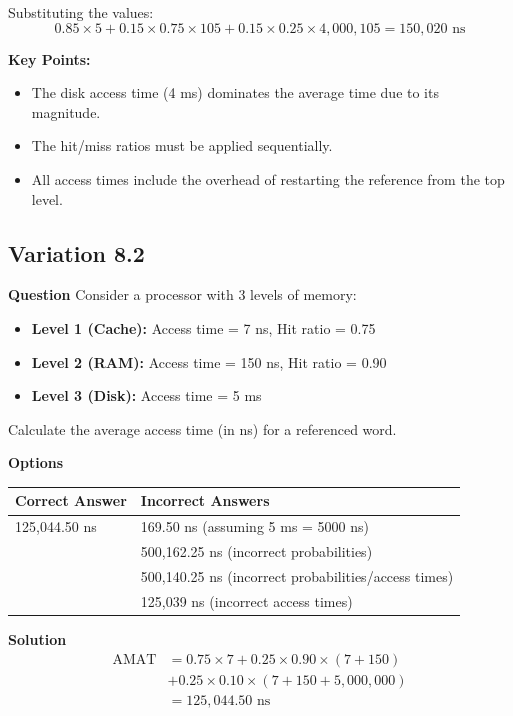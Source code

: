 \noindent Substituting the values:
\[
0.85 \times 5 + 0.15 \times 0.75 \times 105 + 0.15 \times 0.25 \times 4,000,105 = 150,020 \text{ ns}
\]

\noindent \textbf{Key Points:}
\begin{itemize}
    \item The disk access time (4 ms) dominates the average time due to its magnitude.
    \item The hit/miss ratios must be applied sequentially.
    \item All access times include the overhead of restarting the reference from the top level.
\end{itemize}



\subsection{Variation 8.2}
\textbf{Question}
Consider a processor with 3 levels of memory:
\begin{itemize}[leftmargin=*]
    \item \textbf{Level 1 (Cache):} Access time = 7 ns, Hit ratio = 0.75
    \item \textbf{Level 2 (RAM):} Access time = 150 ns, Hit ratio = 0.90
    \item \textbf{Level 3 (Disk):} Access time = 5 ms
\end{itemize}

\noindent Calculate the average access time (in ns) for a referenced word.

\textbf{Options}
\begin{tabular}{ll}
    \textbf{Correct Answer} & \textbf{Incorrect Answers} \\
    \hline
    125,044.50 ns & 169.50 ns (assuming 5 ms = 5000 ns) \\
    & 500,162.25 ns (incorrect probabilities) \\
    & 500,140.25 ns (incorrect probabilities/access times) \\
    & 125,039 ns (incorrect access times) \\
\end{tabular}

\textbf{Solution}
\[
\begin{aligned}
\text{AMAT} &= 0.75 \times 7 + 0.25 \times 0.90 \times (7 + 150) \\
           &+ 0.25 \times 0.10 \times (7 + 150 + 5,000,000) \\
           &= 125,044.50 \text{ ns}
\end{aligned}
\]

